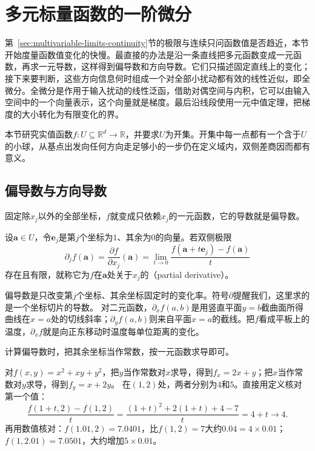 \par{}

\label{sec:analysis-multivariable-differentiation}
\label{sec:multivariable-differentiation}

\section{多元标量函数的一阶微分}
\label{sec:multivariable-scalar-first-order}

第~\ref{sec:multivariable-limits-continuity}节的极限与连续只问函数值是否趋近，本节开始度量函数值变化的快慢。最直接的办法是沿一条直线把多元函数变成一元函数，再求一元导数，这样得到偏导数和方向导数。它们只描述固定直线上的变化；接下来要判断，这些方向信息何时组成一个对全部小扰动都有效的线性近似，即全微分。全微分是作用于输入扰动的线性泛函，借助对偶空间与内积，它可以由输入空间中的一个向量表示，这个向量就是梯度。最后沿线段使用一元中值定理，把梯度的大小转化为有限变化的界。

本节研究实值函数$f:U\subseteq\mathbb R^d\to\mathbb R$，并要求$U$为开集。开集中每一点都有一个含于$U$的小球，从基点出发向任何方向走足够小的一步仍在定义域内，双侧差商因而都有意义。

\subsection{偏导数与方向导数}

固定除$x_j$以外的全部坐标，$f$就变成只依赖$x_j$的一元函数，它的导数就是偏导数。
\begin{definition}[偏导数]
\label{def:multivariable-partial-derivative}
设$\bm a\in U$，令$\bm e_j$是第$j$个坐标为$1$、其余为$0$的向量。若双侧极限
\[
 \partial_jf(\bm a)=\frac{\partial f}{\partial x_j}(\bm a)
 =\lim_{t\to0}\frac{f(\bm a+t\bm e_j)-f(\bm a)}t
\]
存在且有限，就称它为$f$在$\bm a$处关于$x_j$的（partial derivative）。
\end{definition}
偏导数是只改变第$j$个坐标、其余坐标固定时的变化率。符号$\partial$提醒我们，这里求的是一个坐标切片的导数。
对二元函数，$\partial_xf(a,b)$是用竖直平面$y=b$截曲面所得曲线在$x=a$处的切线斜率；$\partial_yf(a,b)$则来自平面$x=a$的截线。把$f$看成平板上的温度，$\partial_xf$就是向正东移动时温度每单位距离的变化。

计算偏导数时，把其余坐标当作常数，按一元函数求导即可。
\begin{example}[二次函数的偏导数]
\label{ex:multivariable-quadratic-partials}
对$f(x,y)=x^2+xy+y^2$，把$y$当作常数对$x$求导，得到$f_x=2x+y$；把$x$当作常数对$y$求导，得到$f_y=x+2y$。
在$(1,2)$处，两者分别为$4$和$5$。直接用定义核对第一个值：
\[
 \frac{f(1+t,2)-f(1,2)}t=\frac{(1+t)^2+2(1+t)+4-7}{t}=4+t\longrightarrow4.
\]
再用数值核对：$f(1.01,2)=7.0401$，比$f(1,2)=7$大约$0.04=4\times0.01$；$f(1,2.01)=7.0501$，大约增加$5\times0.01$。
\end{example}

